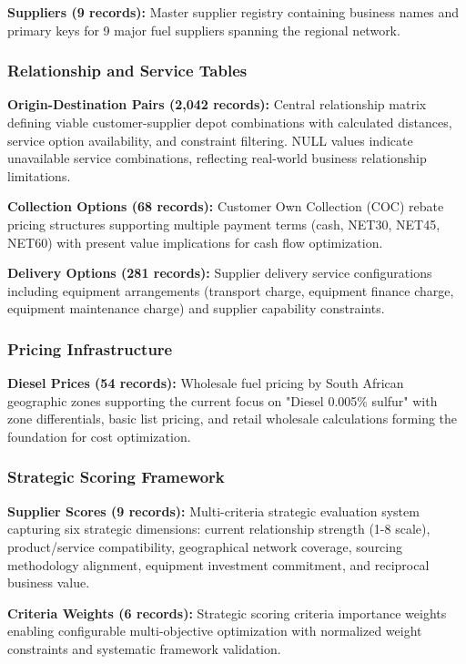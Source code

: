 \textbf{Suppliers (9 records):} Master supplier registry containing business names and primary keys for 9 major fuel suppliers spanning the regional network.

\subsubsection{Relationship and Service Tables}
\textbf{Origin-Destination Pairs (2,042 records):} Central relationship matrix defining viable customer-supplier depot combinations with calculated distances, service option availability, and constraint filtering. NULL values indicate unavailable service combinations, reflecting real-world business relationship limitations.

\textbf{Collection Options (68 records):} Customer Own Collection (COC) rebate pricing structures supporting multiple payment terms (cash, NET30, NET45, NET60) with present value implications for cash flow optimization.

\textbf{Delivery Options (281 records):} Supplier delivery service configurations including equipment arrangements (transport charge, equipment finance charge, equipment maintenance charge) and supplier capability constraints.

\subsubsection{Pricing Infrastructure}
\textbf{Diesel Prices (54 records):} Wholesale fuel pricing by South African geographic zones supporting the current focus on "Diesel 0.005\% sulfur" with zone differentials, basic list pricing, and retail wholesale calculations forming the foundation for cost optimization.

\subsubsection{Strategic Scoring Framework}
\textbf{Supplier Scores (9 records):} Multi-criteria strategic evaluation system capturing six strategic dimensions: current relationship strength (1-8 scale), product/service compatibility, geographical network coverage, sourcing methodology alignment, equipment investment commitment, and reciprocal business value.

\textbf{Criteria Weights (6 records):} Strategic scoring criteria importance weights enabling configurable multi-objective optimization with normalized weight constraints and systematic framework validation.

